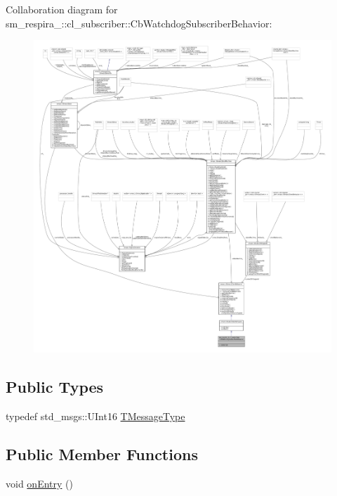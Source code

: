 Collaboration diagram for sm\+\_\+respira\+\_\+:\+:cl\+\_\+subscriber\+:\+:Cb\+Watchdog\+Subscriber\+Behavior\+:
\nopagebreak
\begin{figure}[H]
\begin{center}
\leavevmode
\includegraphics[width=350pt]{classsm__respira__1_1_1cl__subscriber_1_1CbWatchdogSubscriberBehavior__coll__graph}
\end{center}
\end{figure}
\subsection*{Public Types}
\begin{DoxyCompactItemize}
\item 
typedef std\+\_\+msgs\+::\+U\+Int16 \hyperlink{classsm__respira__1_1_1cl__subscriber_1_1CbWatchdogSubscriberBehavior_a75e13b41dd7bdc836b21f2b4cfdd6ad8}{T\+Message\+Type}
\end{DoxyCompactItemize}
\subsection*{Public Member Functions}
\begin{DoxyCompactItemize}
\item 
void \hyperlink{classsm__respira__1_1_1cl__subscriber_1_1CbWatchdogSubscriberBehavior_a46e8bc156a0f8b3bafa2a6d6f02659ec}{on\+Entry} ()
\end{DoxyCompactItemize}
